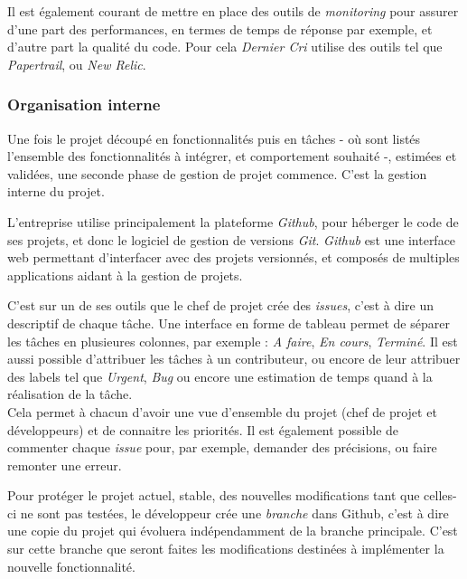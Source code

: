 \documentclass[12pt,a4paper]{article}
\begin{document}
  \bigskip

  Il est également courant de mettre en place des outils de
  \emph{monitoring} pour assurer d'une part des performances, en termes de
  temps de réponse par exemple, et d'autre part la qualité du code. Pour
  cela \emph{Dernier Cri} utilise des outils tel que \emph{Papertrail}, ou
  \emph{New Relic}.

  \bigskip

  \subsubsection{Organisation interne}\label{organisation-interne}

  \bigskip

  Une fois le projet découpé en fonctionnalités puis en tâches - où sont
  listés l'ensemble des fonctionnalités à intégrer, et comportement
  souhaité -, estimées et validées, une seconde phase de gestion de projet
  commence. C'est la gestion interne du projet.

  L'entreprise utilise principalement la plateforme \emph{Github}, pour
  héberger le code de ses projets, et donc le logiciel de gestion de
  versions \emph{Git}. \emph{Github} est une interface web permettant
  d'interfacer avec des projets versionnés, et composés de multiples
  applications aidant à la gestion de projets.

  \bigskip

  C'est sur un de ses outils que le chef de projet crée des \emph{issues},
  c'est à dire un descriptif de chaque tâche. Une interface en forme de
  tableau permet de séparer les tâches en plusieures colonnes, par exemple
  : \emph{A faire}, \emph{En cours}, \emph{Terminé}. Il est aussi possible
  d'attribuer les tâches à un contributeur, ou encore de leur attribuer
  des labels tel que \emph{Urgent}, \emph{Bug} ou encore une estimation de
  temps quand à la réalisation de la tâche.\\
  Cela permet à chacun d'avoir une vue d'ensemble du projet (chef de
  projet et développeurs) et de connaitre les priorités. Il est également
  possible de commenter chaque \emph{issue} pour, par exemple, demander
  des précisions, ou faire remonter une erreur.

  \bigskip

  Pour protéger le projet actuel, stable, des nouvelles modifications tant
  que celles-ci ne sont pas testées, le développeur crée une
  \emph{branche} dans Github, c'est à dire une copie du projet qui
  évoluera indépendamment de la branche principale. C'est sur cette
  branche que seront faites les modifications destinées à implémenter la
  nouvelle fonctionnalité.
\end{document}
